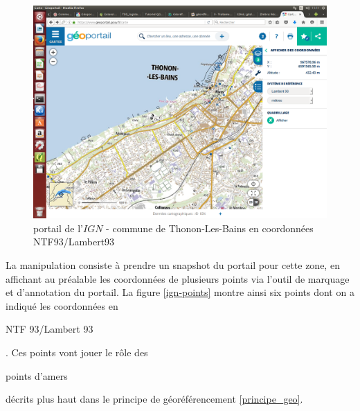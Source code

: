\documentclass{book}
\begin{document}
\begin{figure}[H]
\begin{center}
\includegraphics[scale=0.3]{images/ign-portail-Thonon.png}
\end{center}
\caption{portail de l'$IGN$ - commune de Thonon-Les-Bains en coordonnées NTF93/Lambert93 \cite{ign-portail}}
\label{ign-portail}
\end{figure}

\clearpage

La manipulation consiste à prendre un snapshot du portail pour cette zone, en affichant au préalable les coordonnées de 
plusieurs points via l'outil de marquage et d'annotation du portail. La figure \ref{ign-points} montre ainsi six points 
dont on a indiqué les coordonnées en \begin{itshape}NTF 93/Lambert 93\end{itshape}. Ces points vont jouer le rôle des 
\begin{itshape}points d'amers\end{itshape} décrits plus haut dans le principe de géoréférencement \ref{principe_geo}.
\end{document}
